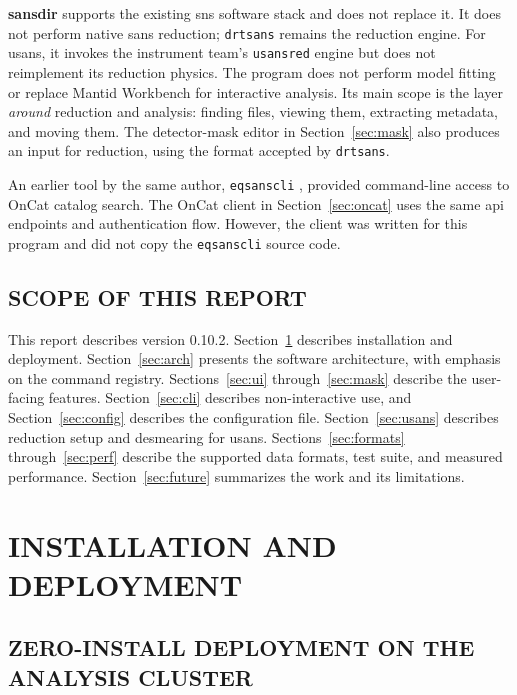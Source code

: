 \documentclass[tm]{ornltm}
\begin{document}
\textbf{sansdir} supports the existing \ac{sns} software stack and does not
replace it. It does not perform native \ac{sans} reduction;
\texttt{drtsans} remains the reduction engine. For \ac{usans}, it invokes the
instrument team's \texttt{usansred} engine but does not reimplement its reduction
physics. The program does not perform model fitting or replace Mantid Workbench
for interactive analysis. Its main scope is the layer \emph{around} reduction
and analysis: finding files, viewing them, extracting metadata, and moving them.
The detector-mask editor in Section~\ref{sec:mask} also produces an input for
reduction, using the format accepted by \texttt{drtsans}.

An earlier tool by the same author, \texttt{eqsanscli} \autocite{eqsanscli},
provided command-line access to OnCat catalog search. The OnCat client in
Section~\ref{sec:oncat} uses the same \ac{api} endpoints and authentication flow.
However, the client was written for this program and did not copy the
\texttt{eqsanscli} source code.

\subsection{SCOPE OF THIS REPORT}

This report describes version 0.10.2. Section~\ref{sec:install} describes
installation and deployment. Section~\ref{sec:arch} presents the software
architecture, with emphasis on the command registry. Sections~\ref{sec:ui}
through~\ref{sec:mask} describe the user-facing features. Section~\ref{sec:cli}
describes non-interactive use, and Section~\ref{sec:config} describes the
configuration file. Section~\ref{sec:usans} describes reduction setup and
desmearing for \ac{usans}. Sections~\ref{sec:formats} through~\ref{sec:perf}
describe the supported data formats, test suite, and measured performance.
Section~\ref{sec:future} summarizes the work and its limitations.

\section{INSTALLATION AND DEPLOYMENT}
\label{sec:install}

\subsection{ZERO-INSTALL DEPLOYMENT ON THE ANALYSIS CLUSTER}
\end{document}
